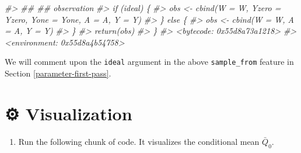 \documentclass[
  11pt,
  openright,twoside]{book}
\newenvironment{Shaded}{\begin{snugshade}}{\end{snugshade}}
\newcommand{\CommentTok}[1]{\textcolor[rgb]{0.56,0.35,0.01}{\textit{#1}}}
\providecommand{\tightlist}{%
  \setlength{\itemsep}{0pt}\setlength{\parskip}{0pt}}
\newcommand{\gear}{\usebox{\gearbox}\;}
\newcommand{\Qbar}{\bar{Q}}
\theoremstyle{definition}
\theoremstyle{definition}
\theoremstyle{definition}
\theoremstyle{definition}
\theoremstyle{remark}
\begin{document}
\begin{Shaded}
\begin{Highlighting}[]
\CommentTok{\#\textgreater{}         \#\# \#\# observation}
\CommentTok{\#\textgreater{}         if (ideal) \{}
\CommentTok{\#\textgreater{}           obs \textless{}{-} cbind(W = W, Yzero = Yzero, Yone = Yone, A = A, Y = Y)}
\CommentTok{\#\textgreater{}         \} else \{}
\CommentTok{\#\textgreater{}           obs \textless{}{-} cbind(W = W, A = A, Y = Y)}
\CommentTok{\#\textgreater{}         \}}
\CommentTok{\#\textgreater{}         return(obs)}
\CommentTok{\#\textgreater{}       \}}
\CommentTok{\#\textgreater{} \textless{}bytecode: 0x55d8a73a1218\textgreater{}}
\CommentTok{\#\textgreater{} \textless{}environment: 0x55d8a4b54758\textgreater{}}
\end{Highlighting}
\end{Shaded}

We will comment upon the \texttt{ideal} argument in the above \texttt{sample\_from} feature
in Section \ref{parameter-first-pass}.

\hypertarget{exo-visualization}{%
\section{\texorpdfstring{⚙ \gear Visualization}{⚙ Visualization}}\label{exo-visualization}}

\begin{enumerate}
\def\labelenumi{\arabic{enumi}.}
\tightlist
\item
  Run the following chunk of code. It visualizes the conditional mean
  \(\Qbar_{0}\).
\end{enumerate}
\end{document}
